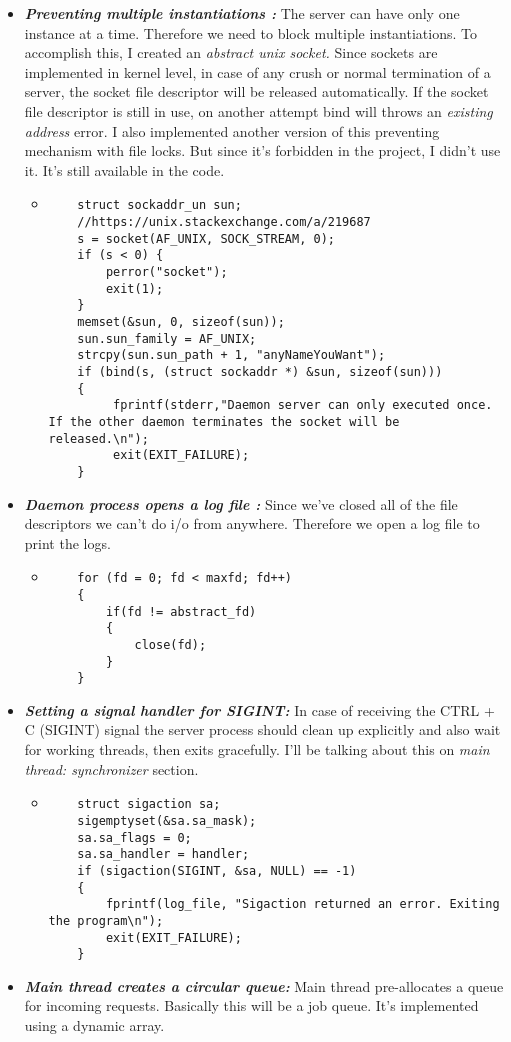 \documentclass{article}
\begin{document}
\begin{itemize}
\item \textbf{\textit{Preventing multiple instantiations :}} The server can have only one instance at a time. Therefore we need to block multiple instantiations. To accomplish this, I created an \textit{abstract unix socket.} Since sockets are implemented in kernel level, in case of any crush or normal termination of a server, the socket file descriptor will be released automatically. If the socket file descriptor is still in use, on another attempt bind will throws an \textit{existing address} error.
\newline I also implemented another version of this preventing mechanism with file locks. But since it's forbidden in the project, I didn't use it. It's still available in the code.
\newpage
\begin{itemize}
  \item
    \begin{lstlisting}
    struct sockaddr_un sun;
    //https://unix.stackexchange.com/a/219687
    s = socket(AF_UNIX, SOCK_STREAM, 0);
    if (s < 0) {
        perror("socket");
        exit(1);
    }
    memset(&sun, 0, sizeof(sun));
    sun.sun_family = AF_UNIX;
    strcpy(sun.sun_path + 1, "anyNameYouWant");
    if (bind(s, (struct sockaddr *) &sun, sizeof(sun)))
    {
         fprintf(stderr,"Daemon server can only executed once. If the other daemon terminates the socket will be released.\n");
         exit(EXIT_FAILURE);
    }
    \end{lstlisting}
\end{itemize}
\item \textbf{\textit{Daemon process opens a log file :}} Since we've closed all of the file descriptors we can't do i/o from anywhere. Therefore we open a log file to print the logs.
\begin{itemize}
  \item
    \begin{lstlisting}
    for (fd = 0; fd < maxfd; fd++)
    {
        if(fd != abstract_fd)
        {
            close(fd);
        }
    }
    \end{lstlisting}
\end{itemize}
\item \textbf{\textit{Setting a signal handler for SIGINT:}}
In case of receiving the CTRL + C (SIGINT) signal the server process should clean up explicitly and also wait for working threads, then exits gracefully. I'll be talking about this on \textit{main thread: synchronizer} section.
\begin{itemize}
  \item
    \begin{lstlisting}
    struct sigaction sa;
    sigemptyset(&sa.sa_mask);
    sa.sa_flags = 0;
    sa.sa_handler = handler;
    if (sigaction(SIGINT, &sa, NULL) == -1)
    {
        fprintf(log_file, "Sigaction returned an error. Exiting the program\n");
        exit(EXIT_FAILURE);
    }
        \end{lstlisting}
\end{itemize}
\item \textbf{\textit{Main thread creates a circular queue:}}
Main thread pre-allocates a queue for incoming requests. Basically this will be a job queue. It's implemented using a dynamic array.


\end{itemize}
\end{document}
